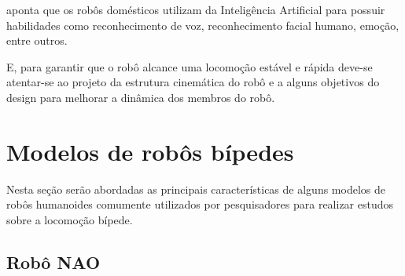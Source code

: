  aponta que os robôs domésticos utilizam da Inteligência Artificial para possuir habilidades como reconhecimento de voz, reconhecimento facial humano, emoção, entre outros.

E, para garantir que o robô alcance uma locomoção estável e rápida deve-se atentar-se ao projeto da estrutura cinemática do robô e a alguns objetivos do design para melhorar a dinâmica dos membros do robô.\cite{Buschmann2009141}












\section{Modelos de robôs bípedes}
\label{sec:modelos}

Nesta seção serão abordadas as principais características de alguns modelos de robôs humanoides comumente utilizados por pesquisadores para realizar estudos sobre a locomoção bípede.

\subsection{Robô NAO}
\label{ssec:nao}

